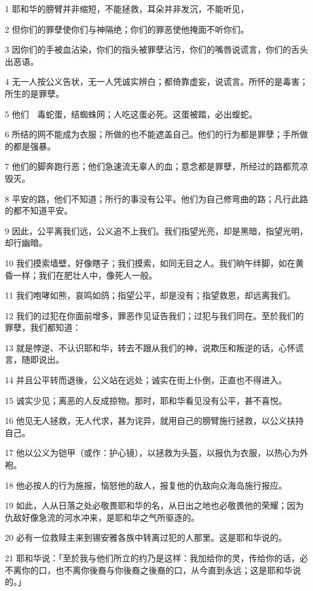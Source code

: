 \par 1 耶和华的膀臂并非缩短，不能拯救，耳朵并非发沉，不能听见，
\par 2 但你们的罪孽使你们与神隔绝；你们的罪恶使他掩面不听你们。
\par 3 因你们的手被血沾染，你们的指头被罪孽沾污，你们的嘴唇说谎言，你们的舌头出恶语。
\par 4 无一人按公义告状，无一人凭诚实辨白；都倚靠虚妄，说谎言。所怀的是毒害；所生的是罪孽。
\par 5 他们　毒蛇蛋，结蜘蛛网；人吃这蛋必死。这蛋被踏，必出蝮蛇。
\par 6 所结的网不能成为衣服；所做的也不能遮盖自己。他们的行为都是罪孽；手所做的都是强暴。
\par 7 他们的脚奔跑行恶；他们急速流无辜人的血；意念都是罪孽，所经过的路都荒凉毁灭。
\par 8 平安的路，他们不知道；所行的事没有公平。他们为自己修弯曲的路；凡行此路的都不知道平安。
\par 9 因此，公平离我们远，公义追不上我们。我们指望光亮，却是黑暗，指望光明，却行幽暗。
\par 10 我们摸索墙壁，好像瞎子；我们摸索，如同无目之人。我们晌午绊脚，如在黄昏一样；我们在肥壮人中，像死人一般。
\par 11 我们咆哮如熊，哀鸣如鸽；指望公平，却是没有；指望救恩，却远离我们。
\par 12 我们的过犯在你面前增多，罪恶作见证告我们；过犯与我们同在。至於我们的罪孽，我们都知道：
\par 13 就是悖逆、不认识耶和华，转去不跟从我们的神，说欺压和叛逆的话，心怀谎言，随即说出。
\par 14 并且公平转而退後，公义站在远处；诚实在街上仆倒，正直也不得进入。
\par 15 诚实少见；离恶的人反成掠物。那时，耶和华看见没有公平，甚不喜悦。
\par 16 他见无人拯救，无人代求，甚为诧异，就用自己的膀臂施行拯救，以公义扶持自己。
\par 17 他以公义为铠甲（或作：护心镜），以拯救为头盔，以报仇为衣服，以热心为外袍。
\par 18 他必按人的行为施报，恼怒他的敌人，报复他的仇敌向众海岛施行报应。
\par 19 如此，人从日落之处必敬畏耶和华的名，从日出之地也必敬畏他的荣耀；因为仇敌好像急流的河水冲来，是耶和华之气所驱逐的。
\par 20 必有一位救赎主来到锡安雅各族中转离过犯的人那里。这是耶和华说的。
\par 21 耶和华说：「至於我与他们所立的约乃是这样：我加给你的灵，传给你的话，必不离你的口，也不离你後裔与你後裔之後裔的口，从今直到永远；这是耶和华说的。」


